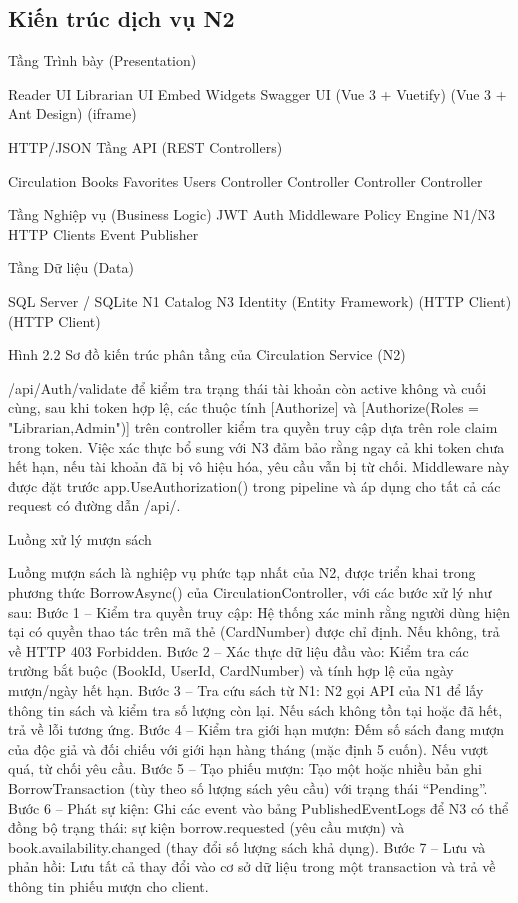 \subsection{Kiến trúc dịch vụ N2}

Tầng Trình bày (Presentation)

Reader UI Librarian UI Embed Widgets Swagger UI (Vue 3 + Vuetify) (Vue 3 + Ant Design) (iframe)

HTTP/JSON Tầng API (REST Controllers)

Circulation Books Favorites Users Controller Controller Controller Controller

Tầng Nghiệp vụ (Business Logic) JWT Auth Middleware Policy Engine N1/N3 HTTP Clients Event Publisher

Tầng Dữ liệu (Data)

SQL Server / SQLite N1 Catalog N3 Identity (Entity Framework) (HTTP Client) (HTTP Client)

Hình 2.2 Sơ đồ kiến trúc phân tầng của Circulation Service (N2)

/api/Auth/validate để kiểm tra trạng thái tài khoản còn active không và cuối cùng, sau khi token hợp lệ, các thuộc tính [Authorize] và [Authorize(Roles = "Librarian,Admin")] trên controller kiểm tra quyền truy cập dựa trên role claim trong token. Việc xác thực bổ sung với N3 đảm bảo rằng ngay cả khi token chưa hết hạn, nếu tài khoản đã bị vô hiệu hóa, yêu cầu vẫn bị từ chối. Middleware này được đặt trước app.UseAuthorization() trong pipeline và áp dụng cho tất cả các request có đường dẫn /api/.

Luồng xử lý mượn sách

Luồng mượn sách là nghiệp vụ phức tạp nhất của N2, được triển khai trong phương thức BorrowAsync() của CirculationController, với các bước xử lý như sau: Bước 1 – Kiểm tra quyền truy cập: Hệ thống xác minh rằng người dùng hiện tại có quyền thao tác trên mã thẻ (CardNumber) được chỉ định. Nếu không, trả về HTTP 403 Forbidden. Bước 2 – Xác thực dữ liệu đầu vào: Kiểm tra các trường bắt buộc (BookId, UserId, CardNumber) và tính hợp lệ của ngày mượn/ngày hết hạn. Bước 3 – Tra cứu sách từ N1: N2 gọi API của N1 để lấy thông tin sách và kiểm tra số lượng còn lại. Nếu sách không tồn tại hoặc đã hết, trả về lỗi tương ứng. Bước 4 – Kiểm tra giới hạn mượn: Đếm số sách đang mượn của độc giả và đối chiếu với giới hạn hàng tháng (mặc định 5 cuốn). Nếu vượt quá, từ chối yêu cầu. Bước 5 – Tạo phiếu mượn: Tạo một hoặc nhiều bản ghi BorrowTransaction (tùy theo số lượng sách yêu cầu) với trạng thái “Pending”. Bước 6 – Phát sự kiện: Ghi các event vào bảng PublishedEventLogs để N3 có thể đồng bộ trạng thái: sự kiện borrow.requested (yêu cầu mượn) và book.availability.changed (thay đổi số lượng sách khả dụng). Bước 7 – Lưu và phản hồi: Lưu tất cả thay đổi vào cơ sở dữ liệu trong một transaction và trả về thông tin phiếu mượn cho client.

